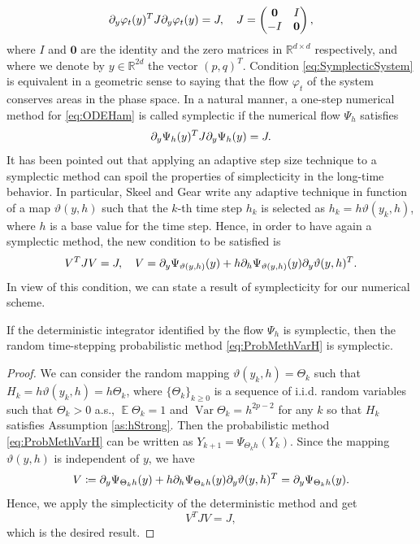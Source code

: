 \documentclass{siamart1116}
\numberwithin{theorem}{section}
\renewcommand{\phi}{\varphi}
\newcommand{\pdv}[2]{\ensuremath\partial_{#2}#1}
\newcommand{\R}{\mathbb{R}}
\newcommand{\defeq}{\coloneqq}
\newcommand{\Var}{\operatorname{Var}}
\newcommand{\E}{\operatorname{\mathbb{E}}}
\begin{document}
\begin{equation}\label{eq:SymplecticSystem}
	\pdv{\phi_t(y)}{y}^T J \pdv{\phi_t(y)}{y} = J, \quad  J = \begin{pmatrix} \mathbf{0} & I \\ -I & \mathbf{0} \end{pmatrix},
\end{equation}
where $I$ and $\mathbf{0}$ are the identity and the zero matrices in $\R^{d\times d}$ respectively, and where we denote by $y\in \R^{2d}$ the vector $(p, q)^T$. Condition \eqref{eq:SymplecticSystem} is equivalent in a geometric sense to saying that the flow $\phi_t$ of the system conserves areas in the phase space. In a natural manner, a one-step numerical method for \eqref{eq:ODEHam} is called symplectic \cite{HLW06} if the numerical flow $\Psi_h$ satisfies
\begin{equation}\label{eq:SymplecticMethod}
	\pdv{\Psi_h(y)}{y}^T J \pdv{\Psi_h(y)}{y} = J.
\end{equation}
It has been pointed out \cite{SkG92, HLW06} that applying an adaptive step size technique to a symplectic method can spoil the properties of simplecticity in the long-time behavior. In particular, Skeel and Gear \cite{SkG92} write any adaptive technique in function of a map $\vartheta(y, h)$ such that the $k$-th time step $h_k$ is selected as $h_k = h\vartheta(y_k, h)$, where $h$ is a base value for the time step. Hence, in order to have again a symplectic method, the new condition to be satisfied is
\begin{equation}
	V^T J V = J, \quad V = \pdv{\Psi_{\vartheta(y, h)}(y)}{y} + h\pdv{\Psi_{\vartheta(y, h)}(y)}{h}\pdv{\vartheta(y, h)}{y}^T.
\end{equation}
In view of this condition, we can state a result of symplecticity for our numerical scheme.
\begin{theorem}\label{thm:SymplecticRandH} If the deterministic integrator identified by the flow $\Psi_h$ is symplectic, then the random time-stepping probabilistic method \eqref{eq:ProbMethVarH} is symplectic.
\end{theorem}
\begin{proof} We can consider the random mapping $\vartheta(y_k, h) = \Theta_k$ such that $H_k = h\vartheta(y_k, h) = h\Theta_k$, where $\{\Theta_k\}_{k \geq 0}$ is a sequence of i.i.d. random variables such that $\Theta_k > 0$ a.s., $\E\Theta_k = 1$ and $\Var\Theta_k = h^{2p - 2}$ for any $k$ so that $H_k$ satisfies Assumption \ref{as:hStrong}. Then the probabilistic method \eqref{eq:ProbMethVarH} can be written as $Y_{k+1} = \Psi_{\Theta_k h}(Y_{k})$. Since the mapping $\vartheta(y, h)$ is independent of $y$, we have
\begin{equation}
	V \defeq \pdv{\Psi_{\Theta_k h}(y)}{y} + h\pdv{\Psi_{\Theta_k h}(y)}{h}\pdv{\vartheta(y, h)}{y}^T = \pdv{\Psi_{\Theta_k h}(y)}{y}.
\end{equation}
Hence, we apply the simplecticity of the deterministic method and get
\begin{equation}
	V^T J V = J,
\end{equation}
which is the desired result.
\end{proof}
\end{document}
